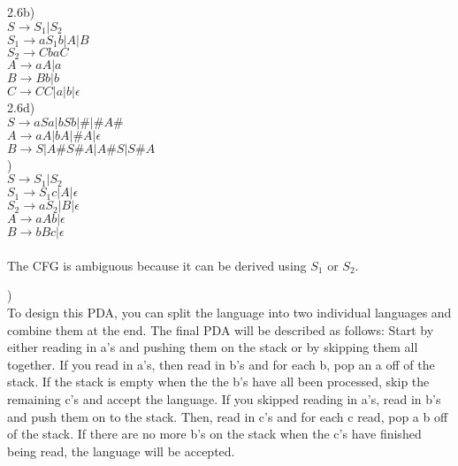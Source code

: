 \documentclass[11pt]{article}
\begin{document}
\noindent2.6b)\\
$S \to S_1 | S_2$ \\
$S_1 \to aS_1b | A | B$ \\
$S_2 \to CbaC$ \\
$A \to aA | a$ \\
$B \to Bb | b$ \\
$C \to CC | a | b | \epsilon$ \\

\noindent2.6d)\\
$S \to aSa | bSb | \# | \#A\#$\\
$A \to aA|bA|\#A|\epsilon$\\
$B \to S|A\#S\#A|A\#S|S\#A$\\

)\\
$S \to S_1|S_2$\\
$S_1 \to S_1c|A|\epsilon$\\
$S_2 \to aS_2|B|\epsilon$\\
$A \to aAb|\epsilon$\\
$B \to bBc|\epsilon$\\ \\
The CFG is ambiguous because it can be derived using $S_1$ or $S_2$.

)\\
To design this PDA, you can split the language into two individual languages and combine them at the end.  The final PDA will be described as follows: Start by either reading in a's and pushing them on the stack or by skipping them all together.  If you read in a's, then read in b's and for each b, pop an a off of the stack.  If the stack is empty when the the b's have all been processed, skip the remaining c's and accept the language.  If you skipped reading in a's, read in b's and push them on to the stack.  Then, read in c's and for each c read, pop a b off of the stack.  If there are no more b's on the stack when the c's have finished being read, the language will be accepted.\\
\end{document}
